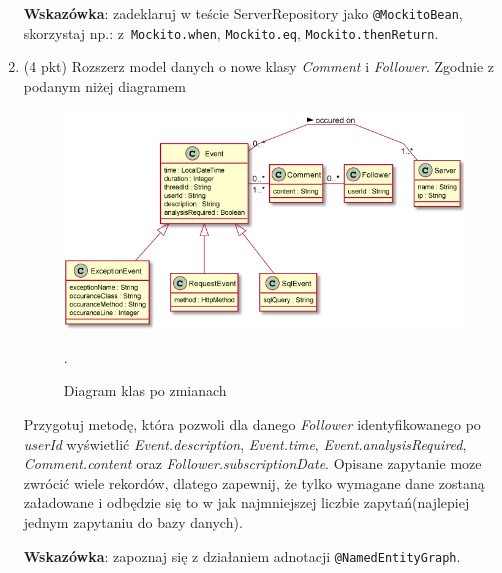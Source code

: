 \documentclass[12pt]{article}
\begin{document}
\begin{enumerate}
            \textbf{Wskazówka}: zadeklaruj w teście ServerRepository jako  \texttt{@MockitoBean}, skorzystaj np.: z~\texttt{Mockito\allowbreak .when}, \texttt{Mockito\allowbreak .eq}, \texttt{Mockito\allowbreak .thenReturn}.

        \item
         (4 pkt) Rozszerz model danych o nowe klasy \emph{Comment} i \emph{Follower}. Zgodnie z podanym niżej diagramem

        \begin{figure}[ht]
            \centering
            \includegraphics{lista4_class_diagram_2.png}
            \caption{Diagram klas po zmianach}.
            \label{fig:class-diagram}
        \end{figure}

        Przygotuj metodę, która pozwoli dla danego \emph{Follower} identyfikowanego po \emph{userId} wyświetlić \emph{Event.description}, \emph{Event.time}, \emph{Event.analysisRequired}, \emph{Comment.content} oraz \emph{Follower.subscriptionDate}. Opisane zapytanie moze zwrócić wiele rekordów, dlatego zapewnij, że tylko wymagane dane zostaną załadowane i odbędzie się to w jak najmniejszej liczbie zapytań(najlepiej jednym zapytaniu do bazy danych).

        \textbf{Wskazówka}: zapoznaj się z działaniem adnotacji \texttt{@NamedEntityGraph}.

    \end{enumerate}
\end{document}
